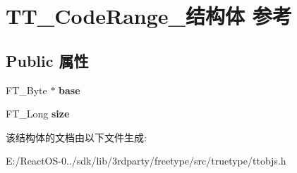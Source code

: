 \hypertarget{struct_t_t___code_range__}{}\section{T\+T\+\_\+\+Code\+Range\+\_\+结构体 参考}
\label{struct_t_t___code_range__}
\subsection*{Public 属性}
\begin{DoxyCompactItemize}
\item 
\mbox{\label{struct_t_t___code_range___a1dda9a59f41191cd109596f0bb79264a}} 
F\+T\+\_\+\+Byte $\ast$ {\bfseries base}
\item 
\mbox{\label{struct_t_t___code_range___ae061e7e1a1cbd13502f6100bc03ba3be}} 
F\+T\+\_\+\+Long {\bfseries size}
\end{DoxyCompactItemize}


该结构体的文档由以下文件生成\+:\begin{DoxyCompactItemize}
\item 
E\+:/\+React\+O\+S-\/0../sdk/lib/3rdparty/freetype/src/truetype/ttobjs.\+h\end{DoxyCompactItemize}
